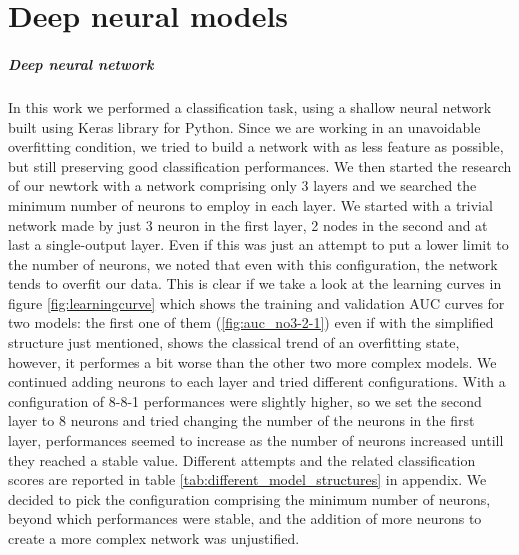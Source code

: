 \documentclass[11pt]{report}
\begin{document}
\newpage
\chapter{Deep neural models} \label{chap:deep_models}
\paragraph{Deep neural network}\hfill

In this work we performed a classification task, using a shallow neural network built using Keras library for Python.
Since we are working in an unavoidable overfitting condition, we tried to build a network with as less feature as possible, but still preserving good classification performances.
We then started the research of our newtork with a network comprising only 3 layers and we searched the minimum number of neurons to employ in each layer.
We started with a trivial network made by just 3 neuron in the first layer, 2 nodes in the second and at last a single-output layer. Even if this was just an attempt to put a lower limit to the number of neurons, we noted that even with this configuration, the network tends to overfit our data.
This is clear if we take a look at the learning curves in figure \ref{fig:learningcurve} which shows the training and validation AUC curves for two models: the first one of them (\ref{fig:auc_no3-2-1}) even if with the simplified structure just mentioned, shows the classical trend of an overfitting state, however, it performes a bit worse than the other two more complex models.
We continued adding neurons to each layer and tried different configurations. With a configuration of 8-8-1 performances were slightly higher, so we set the second layer to 8 neurons and tried changing the number of the neurons in the first layer, performances seemed to increase as the number of neurons increased untill they reached a stable value. Different attempts and the related classification scores are reported in table \ref{tab:different_model_structures} in appendix.
We decided to pick the configuration comprising the minimum number of neurons, beyond which performances were stable, and the addition of more neurons to create a more complex network was unjustified.
\end{document}
